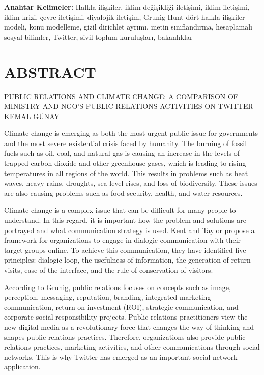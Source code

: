 \documentclass[
]{book}
\begin{document}
\textbf{Anahtar Kelimeler:} Halkla ilişkiler, iklim değişikliği iletişimi, iklim iletişimi, iklim krizi, çevre iletişimi, diyalojik iletişim, Grunig-Hunt dört halkla ilişkiler modeli, konu modelleme, gizil dirichlet ayrımı, metin sınıflandırma, hesaplamalı sosyal bilimler, Twitter, sivil toplum kuruluşları, bakanlıklar

\hypertarget{abstract}{%
\chapter*{ABSTRACT}\label{abstract}}

PUBLIC RELATIONS AND CLIMATE CHANGE: A COMPARISON OF MINISTRY AND NGO'S PUBLIC RELATIONS ACTIVITIES ON TWITTER
KEMAL GÜNAY

Climate change is emerging as both the most urgent public issue for governments and the most severe existential crisis faced by humanity. The burning of fossil fuels such as oil, coal, and natural gas is causing an increase in the levels of trapped carbon dioxide and other greenhouse gases, which is leading to rising temperatures in all regions of the world. This results in problems such as heat waves, heavy rains, droughts, sea level rises, and loss of biodiversity. These issues are also causing problems such as food security, health, and water resources.

Climate change is a complex issue that can be difficult for many people to understand. In this regard, it is important how the problem and solutions are portrayed and what communication strategy is used. Kent and Taylor propose a framework for organizations to engage in dialogic communication with their target groups online. To achieve this communication, they have identified five principles: dialogic loop, the usefulness of information, the generation of return visits, ease of the interface, and the rule of conservation of visitors.

According to Grunig, public relations focuses on concepts such as image, perception, messaging, reputation, branding, integrated marketing communication, return on investment (ROI), strategic communication, and corporate social responsibility projects. Public relations practitioners view the new digital media as a revolutionary force that changes the way of thinking and shapes public relations practices. Therefore, organizations also provide public relations practices, marketing activities, and other communications through social networks. This is why Twitter has emerged as an important social network application.
\end{document}
